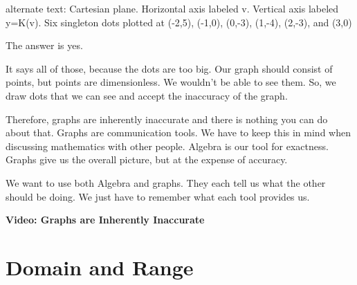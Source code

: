 \documentclass{ximera}
\begin{document}
\textcolor{gray!90}{alternate text: Cartesian plane. Horizontal axis labeled v. Vertical axis labeled y=K(v). Six singleton dots plotted at (-2,5), (-1,0), (0,-3), (1,-4), (2,-3), and (3,0)}



The answer is yes.  


It says all of those, because the dots are too big.  Our graph should consist of points, but points are dimensionless.  We wouldn't be able to see them.  So, we draw dots that we can see and accept the inaccuracy of the graph.

Therefore, graphs are inherently inaccurate and there is nothing you can do about that.  Graphs are communication tools. We have to keep this in mind when discussing mathematics with other people. Algebra is our tool for exactness.  Graphs give us the overall picture, but at the expense of accuracy.

We want to use both Algebra and graphs.  They each tell us what the other should be doing.  We just have to remember what each tool provides us.










\begin{explanation} \textbf{\textcolor{red!75!green}{Video: Graphs are Inherently Inaccurate}}


\begin{onlineOnly}
\begin{expandable} 

\begin{center}
\end{center}

\end{expandable}
\end{onlineOnly}

\end{explanation}















\section*{Domain and Range}
\end{document}
